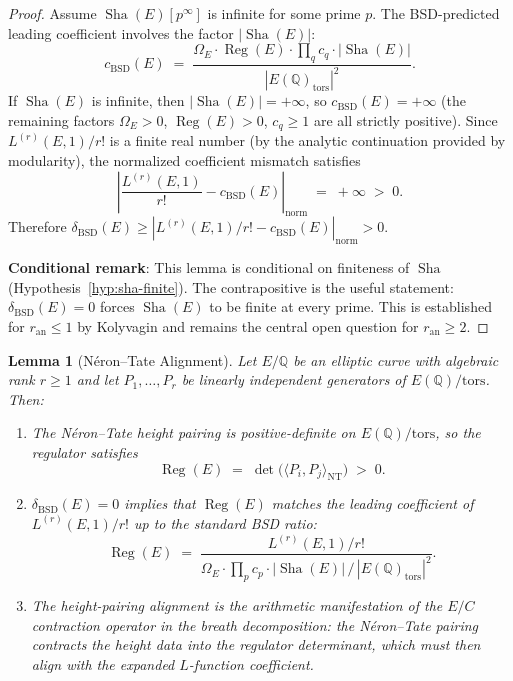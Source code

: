 \documentclass[11pt]{article}
\newtheorem{lemma}[theorem]{Lemma}
\DeclareMathOperator{\Reg}{Reg}
\DeclareMathOperator{\Sha}{Sha}
\begin{document}
\begin{proof}
Assume $\Sha(E)[p^\infty]$ is infinite for some prime $p$.  The BSD-predicted
leading coefficient involves the factor $|\Sha(E)|$:
\[
  c_{\mathrm{BSD}}(E) \;=\;
  \frac{\Omega_E \cdot \Reg(E) \cdot \prod_q c_q \cdot |\Sha(E)|}
       {|E(\mathbb{Q})_{\mathrm{tors}}|^2}.
\]
If $\Sha(E)$ is infinite, then $|\Sha(E)| = +\infty$, so
$c_{\mathrm{BSD}}(E) = +\infty$ (the remaining factors $\Omega_E > 0$,
$\Reg(E) > 0$, $c_q \geq 1$ are all strictly positive).  Since
$L^{(r)}(E,1)/r!$ is a finite real number (by the analytic continuation
provided by modularity), the normalized coefficient mismatch satisfies
\[
  \left| \frac{L^{(r)}(E,1)}{r!} - c_{\mathrm{BSD}}(E) \right|_{\mathrm{norm}}
  \;=\; +\infty
  \;>\; 0.
\]
Therefore $\delta_{\mathrm{BSD}}(E) \geq
|L^{(r)}(E,1)/r! - c_{\mathrm{BSD}}(E)|_{\mathrm{norm}} > 0$.

\textbf{Conditional remark}: This lemma is conditional on finiteness of $\Sha$
(Hypothesis~\ref{hyp:sha-finite}).  The contrapositive is the useful statement:
$\delta_{\mathrm{BSD}}(E) = 0$ forces $\Sha(E)$ to be finite at every prime.
This is established for $r_{\mathrm{an}} \leq 1$ by Kolyvagin \cite{Koly}
and remains the central open question for $r_{\mathrm{an}} \geq 2$.
\end{proof}

\begin{lemma}[N\'eron--Tate Alignment]
\label{lem:neron-tate-align}
Let $E/\mathbb{Q}$ be an elliptic curve with algebraic rank $r \geq 1$ and
let $P_1, \ldots, P_r$ be linearly independent generators of
$E(\mathbb{Q})/\mathrm{tors}$.  Then:
\begin{enumerate}
  \item The N\'eron--Tate height pairing is positive-definite on
    $E(\mathbb{Q})/\mathrm{tors}$, so the regulator satisfies
    \[
      \Reg(E) \;=\; \det\bigl(\langle P_i, P_j \rangle_{\mathrm{NT}}\bigr)
      \;>\; 0.
    \]
  \item $\delta_{\mathrm{BSD}}(E) = 0$ implies that $\Reg(E)$ matches the
    leading coefficient of $L^{(r)}(E,1)/r!$ up to the standard BSD ratio:
    \[
      \Reg(E) \;=\;
      \frac{L^{(r)}(E,1)/r!}
           {\Omega_E \cdot \prod_p c_p \cdot |\Sha(E)|\,/\,
            |E(\mathbb{Q})_{\mathrm{tors}}|^2}.
    \]
  \item The height-pairing alignment is the arithmetic manifestation of the
    $E/C$ contraction operator in the breath decomposition: the N\'eron--Tate
    pairing \emph{contracts} the height data into the regulator determinant,
    which must then align with the \emph{expanded} $L$-function coefficient.
\end{enumerate}
\end{lemma}
\end{document}
